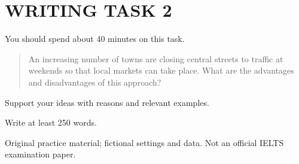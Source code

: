 \section*{WRITING TASK 2}
You should spend about 40 minutes on this task.

\begin{quote}\large An increasing number of towns are closing central streets to traffic at weekends so that local markets can take place. What are the advantages and disadvantages of this approach?
\end{quote}
Support your ideas with reasons and relevant examples.

Write at least 250 words.
\par\bigskip
{\footnotesize\color{gray} Original practice material; fictional settings and data. Not an official IELTS examination paper.}
